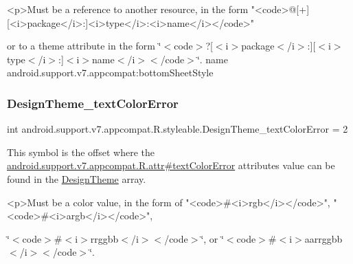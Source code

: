 \begin{DoxyVerb}      <p>Must be a reference to another resource, in the form "<code>@[+][<i>package</i>:]<i>type</i>:<i>name</i></code>"
\end{DoxyVerb}
 or to a theme attribute in the form \char`\"{}$<$code$>$?\mbox{[}$<$i$>$package$<$/i$>$\+:\mbox{]}\mbox{[}$<$i$>$type$<$/i$>$\+:\mbox{]}$<$i$>$name$<$/i$>$$<$/code$>$\char`\"{}.  name android.\+support.\+v7.\+appcompat\+:bottom\+Sheet\+Style \mbox{\label{classandroid_1_1support_1_1v7_1_1appcompat_1_1R_1_1styleable_adc51f4b1386970d13ffffdb5a983b662}} 
\subsubsection{\texorpdfstring{Design\+Theme\+\_\+text\+Color\+Error}{DesignTheme\_textColorError}}
{\footnotesize\ttfamily int android.\+support.\+v7.\+appcompat.\+R.\+styleable.\+Design\+Theme\+\_\+text\+Color\+Error = 2\hspace{0.3cm}{\ttfamily [static]}}

This symbol is the offset where the \hyperlink{classandroid_1_1support_1_1v7_1_1appcompat_1_1R_1_1attr_abd277e699c01cd80ea57d1e4e881df22}{android.\+support.\+v7.\+appcompat.\+R.\+attr\#text\+Color\+Error} attribute\textquotesingle{}s value can be found in the \hyperlink{classandroid_1_1support_1_1v7_1_1appcompat_1_1R_1_1styleable_aff3ce11bdf266828d90b9a386168c4b0}{Design\+Theme} array.

\begin{DoxyVerb}      <p>Must be a color value, in the form of "<code>#<i>rgb</i></code>", "<code>#<i>argb</i></code>",
\end{DoxyVerb}
 \char`\"{}$<$code$>$\#$<$i$>$rrggbb$<$/i$>$$<$/code$>$\char`\"{}, or \char`\"{}$<$code$>$\#$<$i$>$aarrggbb$<$/i$>$$<$/code$>$\char`\"{}. 

